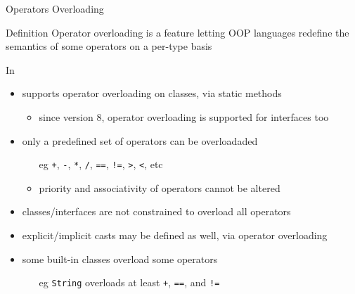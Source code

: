 \documentclass[presentation]{beamer}
\begin{document}
\begin{frame}[allowframebreaks]{Operators Overloading}
  \begin{exampleblock}{Definition}\centering
    Operator overloading is a feature letting OOP languages redefine the semantics of some operators on a per-type basis
  \end{exampleblock}

  \begin{block}{In \dotnet}
    \begin{itemize}
      \item \dotnet supports operator overloading on classes, via static methods
      \begin{itemize}
        \item since version 8, operator overloading is supported for interfaces too
      \end{itemize}

      \item only a predefined set of operators can be overloadaded
      \begin{itemize}
        \item[eg] \texttt{+}, \texttt{-}, \texttt{*}, \texttt{/}, \texttt{==}, \texttt{!=}, \texttt{>}, \texttt{<}, etc
        \item priority and associativity of operators cannot be altered
      \end{itemize}

      \item classes/interfaces are not constrained to overload all operators
      
      \item explicit/implicit casts may be defined as well, via operator overloading
      
      \item some built-in classes overload some operators
      \begin{itemize}
        \item[eg] \texttt{String} overloads at least \texttt{+}, \texttt{==}, and \texttt{!=}
      \end{itemize}
    \end{itemize}
  \end{block}


\end{frame}
\end{document}
